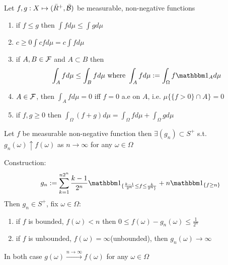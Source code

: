 \begin{thm}
Let $f,g: X \mapsto (\bar{R}^+, \bar{\mathcal{B}})$ be measurable, non-negative functions 
\begin{enumerate}
    \item if $f\leq g$ then $\int f d\mu \leq \int g d\mu$
    \item $c\geq 0 \int cf d\mu = c\int fd\mu$
    \item if $A,B\in \mathcal{F}$ and $A\subset B$ then \begin{equation*}
        \int_A fd\mu \leq \int_B fd\mu \text{ where } \int_A fd\mu := \int_\Omega f \I_A d\mu 
    \end{equation*}
    \item $A\in \mathcal{F}$, then $\int_A fd\mu = 0$ iff $f=0$ a.e on $A$, i.e. $\mu\{\{f>0\} \cap A\} = 0$
    \item if $f, g\geq 0$ then $\int_\Omega (f+g) d\mu = \int_\Omega f d\mu+\int_\Omega g d\mu$
\end{enumerate}
\end{thm}
\pf 
\newpage
\begin{lem} Let $f$ be measurable non-negative function then $\exists (g_n) \subset S^+$ s.t. $g_n(\omega)\uparrow f(\omega)$ as $n \rightarrow \infty$ for any $\omega\in \Omega$
\end{lem}
\pf Construction:\begin{equation*}
    g_n := \bigs{k=1}^{n2^n} \frac{k-1}{2^n} \I_{\{\frac{k-1}{2^n} \leq f\leq \frac{k}{2^n\}}} + n \I_{\{f\geq n\}} 
\end{equation*}Then $g_n\in S^+$, fix $\omega \in \Omega$:
\begin{enumerate}
    \item if $f$ is bounded, $f(\omega) < n $ then $0 \leq f(\omega) - g_n(\omega)\leq \frac{1}{2^n}$
    \item if $f$ is unbounded, $f(\omega) = \infty $(unbounded), then $g_n(\omega) \rightarrow \infty$
\end{enumerate}
 In both case $g(\omega)\xrightarrow{n\rightarrow \infty} f(\omega)$ for any $\omega\in \Omega$

